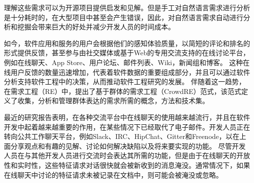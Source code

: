 
理解这些需求可以为开源项目提供启发和见解。但是手工对自然语言需求进行分析是十分耗时的，在大型项目中甚至会产生错误\cite{vlas2012two}，因此，对自然语言需求自动进行分析和挖掘会带来巨大的好处并减少开发人员的时间成本。

如今，软件应用和服务的用户会根据他们的感知体验质量，以简短的评论和排名的形式提供反馈，甚至参与由社交媒体或基于Web的专用交流支持的在线讨论平台，例如在线聊天、App Store、用户论坛、邮件列表、Wiki，新闻组和博客。 这种在线用户反馈的数量迅速增加，代表着软件数据的重要组成部分，并且可以通过软件分析支持软件工程中的决策，从而推动软件工程研究的发展\cite{Morales2019Speech}。 
伴随着这一趋势，在需求工程（RE）中，提出了基于群体的需求工程（CrowdRE）\cite{groen2017crowd}范式，该范式定义了收集，分析和管理群体表达的需求所需的概念，方法和技术集。

最近的研究报告表明，在各种交流平台中在线聊天的使用越来越流行，并且在软件开发中起着越来越重要的作用，在某些情况下已经取代了电子邮件\cite{lin2016developers}。开发人员正在转向公共工作聊天平台，例如Slack、IRC、HipChat、Gitter和Freenode，以在上面分享观点和有趣的见解、讨论如何解决缺陷以及将来要实现的功能\cite{chatterjee2019exploratory}。
尽管开发人员在与其他开发人员进行交流时会表达其所需的功能，但是由于在线聊天的开放性和实时性，这些特征请求对话很快就会被新收到的消息淹没。通常情况下，如果在线聊天中讨论的特征请求未被记录在文档中，则可能会被淹没或忽略。

